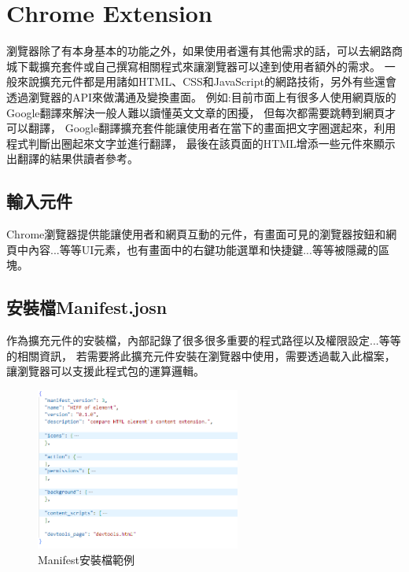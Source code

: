 \section{Chrome Extension}\label{s2.6}

瀏覽器除了有本身基本的功能之外，如果使用者還有其他需求的話，可以去網路商城下載擴充套件或自己撰寫相關程式來讓瀏覽器可以達到使用者額外的需求。
一般來說擴充元件\cite{Chrome-Extension}\cite{Chrome-Extension-Thesis}都是用諸如HTML、CSS和JavaScript的網路技術，另外有些還會透過瀏覽器的API來做溝通及變換畫面。
例如:目前市面上有很多人使用網頁版的Google翻譯來解決一般人難以讀懂英文文章的困擾，
但每次都需要跳轉到網頁才可以翻譯，
Google翻譯擴充套件能讓使用者在當下的畫面把文字圈選起來，利用程式判斷出圈起來文字並進行翻譯，
最後在該頁面的HTML增添一些元件來顯示出翻譯的結果供讀者參考。

\subsection{輸入元件}\label{s2.6.1}
Chrome瀏覽器提供能讓使用者和網頁互動的元件，有畫面可見的瀏覽器按鈕和網頁中內容...等等UI元素，也有畫面中的右鍵功能選單和快捷鍵...等等被隱藏的區塊。

\subsection{安裝檔Manifest.josn}\label{s2.6.2}
作為擴充元件的安裝檔，內部記錄了很多很多重要的程式路徑以及權限設定...等等的相關資訊，
若需要將此擴充元件安裝在瀏覽器中使用，需要透過載入此檔案，讓瀏覽器可以支援此程式包的運算邏輯。

\begin{figure}[H]
    \centering
    \includegraphics[width=0.6\textwidth]{picture/ch2-manifest.png}
    \caption{Manifest安裝檔範例}
    \label{f2.4}
\end{figure}

